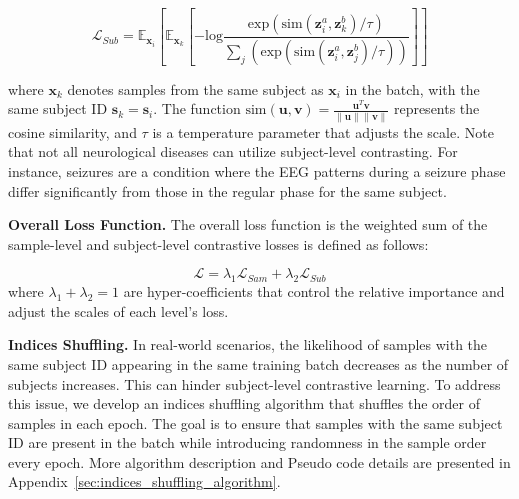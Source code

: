 \begin{equation}
\label{eq:subject_loss}
\mathcal{L}_{Sub} = 
\mathbb{E}_{\bm{x}_i}
    \left[
    \mathbb{E}_{\bm{x}_k}
    \left[
    -\textrm{log}
        \frac
            {\textrm{exp}( \textrm{sim}( \bm{z}_i^a, \bm{z}_k^b ) / \tau)}
            {
            \sum_{j}
                \left(
                \textrm{exp}( \textrm{sim}( \bm{z}_i^a, \bm{z}_j^b ) / \tau)
                \right)
            }
    \right]
    \right]
\end{equation}

where $\bm{x}_k$ denotes samples from the same subject as $\bm{x}_i$ in the batch, with the same subject ID $\bm{s}_k = \bm{s}_i$. The function $\textrm{sim} (\bm{u}, \bm{v}) = \frac{\bm{u}^T \bm{v}}{\|\bm{u}\| \|\bm{v}\|}$ represents the cosine similarity, and $\tau$ is a temperature parameter that adjusts the scale. Note that not all neurological diseases can utilize subject-level contrasting. For instance, seizures are a condition where the EEG patterns during a seizure phase differ significantly from those in the regular phase for the same subject.



\textbf{Overall Loss Function.}
The overall loss function is the weighted sum of the sample-level and subject-level contrastive losses is defined as follows: 

\begin{equation}
\label{eq:joint_loss}
\mathcal{L} = 
    {\lambda_1} \mathcal{L}_{Sam} + 
    {\lambda_2} \mathcal{L}_{Sub}  
\end{equation}
where ${\lambda_1} + {\lambda_2} = 1$ are hyper-coefficients that control the relative importance and adjust the scales of each level's loss.


\textbf{Indices Shuffling.} In real-world scenarios, the likelihood of samples with the same subject ID appearing in the same training batch decreases as the number of subjects increases. This can hinder subject-level contrastive learning. To address this issue, we develop an indices shuffling algorithm that shuffles the order of samples in each epoch. The goal is to ensure that samples with the same subject ID are present in the batch while introducing randomness in the sample order every epoch. More algorithm description and Pseudo code details are presented in Appendix~\ref{sec:indices_shuffling_algorithm}.






